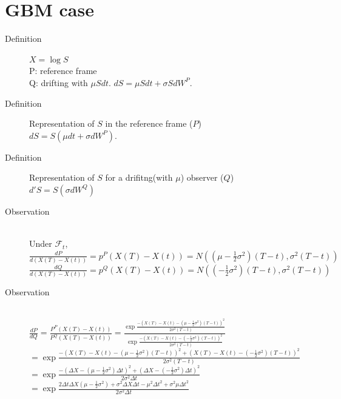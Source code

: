 \documentclass{article}
\begin{document}
\section{GBM case}
\begin{description}
    \item[Definition] $X = \log S$ \\
          P: reference frame \\
          Q: drifting with $\mu S dt$. $dS = \mu S dt + \sigma S dW^P$.
    \item[Definition] Representation of $S$ in the reference frame ($P$) \\
          $dS = S (\mu dt + \sigma dW^P)$.
    \item[Definition] Representation of $S$ for a drifitng(with $\mu$) observer ($Q$) \\
          $d' S = S (\sigma dW^Q)$
    \item[Observation] ~\\
          Under $\mathcal{F}_t$, \\
          $\frac{dP}{d(X(T)-X(t))} = p^P(X(T)-X(t)) = N( (\mu - \frac{1}{2}\sigma^2) (T-t), \sigma^2 (T-t))$\\
          $\frac{dQ}{d(X(T)-X(t))} = p^Q(X(T)-X(t)) = N( (- \frac{1}{2}\sigma^2) (T-t), \sigma^2 (T-t))$\\
    \item[Observation] ~\\
          $\frac{dP}{dQ} =
              \frac{P^P(X(T)-X(t))}{P^Q(X(T)-X(t))} =
              \frac{\exp \frac{-(X(T)-X(t)-(\mu - \frac{1}{2} \sigma^2) (T-t))^2}{2\sigma^2 (T-t)}}{\exp \frac{-(X(T)-X(t)-(- \frac{1}{2} \sigma^2) (T-t))^2}{2\sigma^2 (T-t)}} $ \\
          $= \exp \frac{-(X(T)-X(t)-(\mu - \frac{1}{2} \sigma^2) (T-t))^2+(X(T)-X(t)-(- \frac{1}{2} \sigma^2) (T-t))^2}{2\sigma^2 (T-t)}$\\
          $= \exp \frac{-(\Delta X-(\mu - \frac{1}{2} \sigma^2) \Delta t)^2+(\Delta X-(- \frac{1}{2} \sigma^2) \Delta t)^2}{2\sigma^2 \Delta t}$\\
          $= \exp \frac{2 \Delta t  \Delta X (\mu - \frac{1}{2} \sigma^2) +\sigma^2 \Delta X \Delta t - \mu^2 \Delta t^2 + \sigma^2 \mu \Delta t ^2  }{2\sigma^2 \Delta t }$\\

\end{description}
\end{document}
